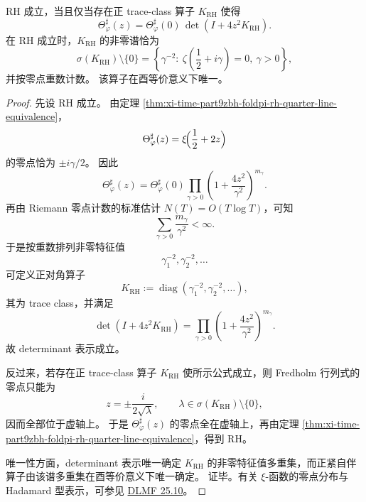 \begin{theorem}\label{thm:xi-time-part9zbh-foldpi-positive-trace-class-rh}
RH 成立，当且仅当存在正 trace-class 算子 \(K_{\mathrm{RH}}\) 使得
\[
\Theta_\varphi^\sharp(z)
=
\Theta_\varphi^\sharp(0)\,
\det(I+4z^2K_{\mathrm{RH}}).
\]
在 RH 成立时，\(K_{\mathrm{RH}}\) 的非零谱恰为
\[
\sigma(K_{\mathrm{RH}})\setminus\{0\}
=
\left\{
\gamma^{-2}:\ \zeta\!\left(\frac12+i\gamma\right)=0,\ \gamma>0
\right\},
\]
并按零点重数计数。
该算子在酉等价意义下唯一。
\end{theorem}
\begin{proof}
先设 RH 成立。
由定理 \ref{thm:xi-time-part9zbh-foldpi-rh-quarter-line-equivalence}，
\[
\Theta_\varphi^\sharp(z)=\xi\!\Bigl(\frac12+2z\Bigr)
\]
的零点恰为 \(\pm i\gamma/2\)。
因此
\[
\Theta_\varphi^\sharp(z)
=
\Theta_\varphi^\sharp(0)
\prod_{\gamma>0}\left(1+\frac{4z^2}{\gamma^2}\right)^{m_\gamma}.
\]
再由 Riemann 零点计数的标准估计 \(N(T)=O(T\log T)\)，可知
\[
\sum_{\gamma>0}\frac{m_\gamma}{\gamma^2}<\infty.
\]
于是按重数排列非零特征值
\[
\gamma_1^{-2},\gamma_2^{-2},\dots
\]
可定义正对角算子
\[
K_{\mathrm{RH}}
:=
\operatorname{diag}(\gamma_1^{-2},\gamma_2^{-2},\dots),
\]
其为 trace class，并满足
\[
\det(I+4z^2K_{\mathrm{RH}})
=
\prod_{\gamma>0}\left(1+\frac{4z^2}{\gamma^2}\right)^{m_\gamma}.
\]
故 determinant 表示成立。

反过来，若存在正 trace-class 算子 \(K_{\mathrm{RH}}\) 使所示公式成立，则 Fredholm 行列式的零点只能为
\[
z=\pm \frac{i}{2\sqrt\lambda},
\qquad
\lambda\in \sigma(K_{\mathrm{RH}})\setminus\{0\},
\]
因而全部位于虚轴上。
于是 \(\Theta_\varphi^\sharp(z)\) 的零点全在虚轴上，再由定理 \ref{thm:xi-time-part9zbh-foldpi-rh-quarter-line-equivalence}，得到 RH。

唯一性方面，determinant 表示唯一确定 \(K_{\mathrm{RH}}\) 的非零特征值多重集，而正紧自伴算子由该谱多重集在酉等价意义下唯一确定。
证毕。有关 \(\xi\)-函数的零点分布与 Hadamard 型表示，可参见 \href{https://dlmf.nist.gov/25.10}{DLMF 25.10}。
\end{proof}

